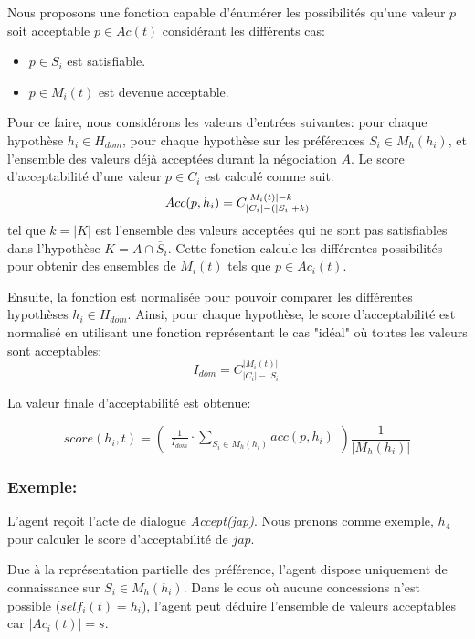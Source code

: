 		Nous proposons une fonction capable d'énumérer les possibilités qu'une valeur $p$ soit acceptable $p \in Ac(t)$ considérant les différents cas: 
			\begin{itemize}
				\item $p \in S_i$ est satisfiable.
				\item $p \in M_i(t)$ est devenue acceptable. 
			\end{itemize} 
		Pour ce faire, nous considérons les valeurs d'entrées suivantes:
		 pour chaque hypothèse $h_i \in H_{dom}$, pour chaque hypothèse sur les préférences $S_i \in M_h(h_i)$, et l'ensemble des valeurs déjà acceptées durant la négociation $A$.
		 Le score d'acceptabilité d'une valeur $p \in C_i$ est calculé comme suit:
			  \begin{equation}
			  \centering
			  Acc(p, h_i) = C_{|C_i|-(|S_i| + k)}^{|M_i(t)| - k}
			  \end{equation}
		 tel que $k = |K| $ est l'ensemble des valeurs acceptées qui ne sont pas satisfiables dans l'hypothèse $K=A \cap \overline S_i$. Cette fonction calcule les différentes possibilités pour obtenir des ensembles de $M_i(t)$ tels que $p \in Ac_i(t)$. 
		 
		 Ensuite, la fonction est normalisée pour pouvoir comparer les différentes hypothèses $h_i \in H_{dom}$. Ainsi, pour chaque hypothèse, le score d'acceptabilité est normalisé en utilisant une fonction représentant le cas "idéal" où toutes les valeurs sont acceptables: 
		 		$$I_{dom} = C_{|C_i|-|S_i|}^{|M_i(t)|}$$
		 		
		 La valeur finale d'acceptabilité est obtenue:
		 
		 	\begin{equation}
			 	score(h_i, t)= \left( \begin{array}{c}  \frac{1}{I_{dom}} \cdot \sum_{S_i \in M_h(h_i) } acc(p, h_i) 
			 	\end{array}\right) \frac{1}{| M_h(h_i)|}
		 	\end{equation} 
		 
		   
		\subsubsection{Exemple: }   
			L'agent reçoit l'acte de dialogue \emph{Accept(jap)}. Nous prenons comme exemple, $h_4$ pour calculer le score d'acceptabilité de $jap$.
			
			Due à la représentation partielle des préférence, l'agent dispose uniquement de connaissance sur $S_i \in M_h(h_i)$.
			Dans le cous où aucune concessions n'est possible ($self_i(t)=h_i$), l'agent peut déduire l'ensemble de valeurs acceptables car $|Ac_i(t)| = s$.
			
